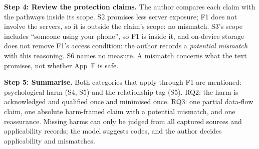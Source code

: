 \documentclass[sigconf,nonacm,natbib=false]{acmart}
\begin{document}
\textbf{Step 4: Review the protection claims.} The author compares each claim
with the pathways inside its scope. S2 promises less server exposure; F1 does
not involve the servers, so it is outside the claim's scope: no mismatch.
S3's scope includes \enquote{someone using your phone}, so F1 is inside it,
and on-device storage does not remove F1's access condition: the author
records a \emph{potential mismatch} with this reasoning. S6 names no measure.
A mismatch concerns what the text promises, not whether App~F is safe.

\textbf{Step 5: Summarise.} Both categories that apply through F1 are
mentioned: psychological harm (S4, S5) and the relationship tag (S5). RQ2: the
harm is acknowledged and qualified once and minimised once. RQ3: one partial
data-flow claim, one absolute harm-framed claim with a potential mismatch, and
one reassurance. Missing harms can only be judged from all captured sources and
applicability records; the model suggests codes, and the author decides
applicability and mismatches.
\end{document}
